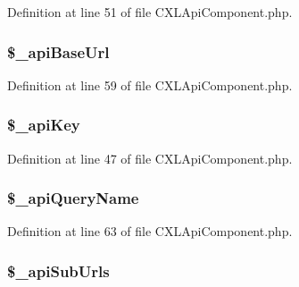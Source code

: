 Definition at line 51 of file CXLApiComponent.php.

\hypertarget{classCXLApiComponent_a2a3098653897c46b33497dd90b807f64}{
\subsubsection[{\$\_\-apiBaseUrl}]{\setlength{\rightskip}{0pt plus 5cm}\$\_\-apiBaseUrl}}
\label{classCXLApiComponent_a2a3098653897c46b33497dd90b807f64}


Definition at line 59 of file CXLApiComponent.php.

\hypertarget{classCXLApiComponent_a30d859488ed1921f08a7e8191363d9a4}{
\subsubsection[{\$\_\-apiKey}]{\setlength{\rightskip}{0pt plus 5cm}\$\_\-apiKey}}
\label{classCXLApiComponent_a30d859488ed1921f08a7e8191363d9a4}


Definition at line 47 of file CXLApiComponent.php.

\hypertarget{classCXLApiComponent_adb92b727d9e245493a2001eca37693de}{
\subsubsection[{\$\_\-apiQueryName}]{\setlength{\rightskip}{0pt plus 5cm}\$\_\-apiQueryName}}
\label{classCXLApiComponent_adb92b727d9e245493a2001eca37693de}


Definition at line 63 of file CXLApiComponent.php.

\hypertarget{classCXLApiComponent_aee5e6cb1a983f0bd5f57cefdd5a97241}{
\subsubsection[{\$\_\-apiSubUrls}]{\setlength{\rightskip}{0pt plus 5cm}\$\_\-apiSubUrls}}
\label{classCXLApiComponent_aee5e6cb1a983f0bd5f57cefdd5a97241}


